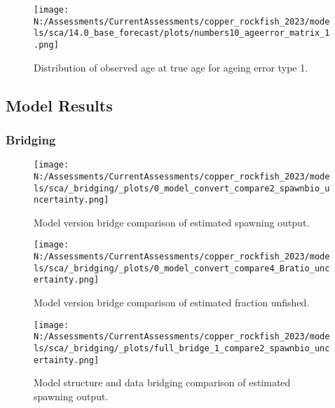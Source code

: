 \documentclass[11pt,
  english,
  letterpaper,
]{article}
\begin{document}
\pagebreak

\begin{figure}
\centering
\texttt{[image: N:/Assessments/CurrentAssessments/copper\_rockfish\_2023/models/sca/14.0\_base\_forecast/plots/numbers10\_ageerror\_matrix\_1.png]}
\caption{Distribution of observed age at true age for ageing error type 1.\label{fig:age-error-matrix}}
\end{figure}

\pagebreak

\hypertarget{model-results}{%
\subsection{Model Results}\label{model-results}}

\hypertarget{bridging}{%
\subsubsection{Bridging}\label{bridging}}

\begin{figure}
\centering
\texttt{[image: N:/Assessments/CurrentAssessments/copper\_rockfish\_2023/models/sca/\_bridging/\_plots/0\_model\_convert\_compare2\_spawnbio\_uncertainty.png]}
\caption{Model version bridge comparison of estimated spawning output.\label{fig:bridge-ssb}}
\end{figure}

\pagebreak

\begin{figure}
\centering
\texttt{[image: N:/Assessments/CurrentAssessments/copper\_rockfish\_2023/models/sca/\_bridging/\_plots/0\_model\_convert\_compare4\_Bratio\_uncertainty.png]}
\caption{Model version bridge comparison of estimated fraction unfished.\label{fig:bridge-depl}}
\end{figure}

\pagebreak

\begin{figure}
\centering
\texttt{[image: N:/Assessments/CurrentAssessments/copper\_rockfish\_2023/models/sca/\_bridging/\_plots/full\_bridge\_1\_compare2\_spawnbio\_uncertainty.png]}
\caption{Model structure and data bridging comparison of estimated spawning output.\label{fig:data-bridge-ssb-1}}
\end{figure}

\pagebreak
\end{document}
